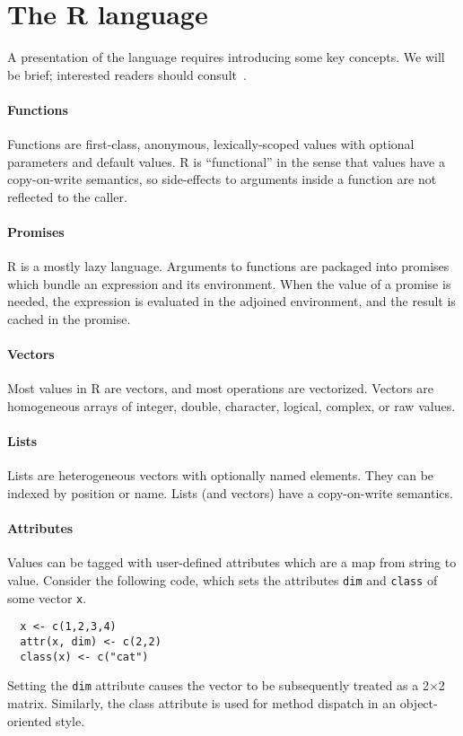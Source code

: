 \documentclass[10pt,sigplan,authorversion=true]{acmart}
\renewcommand{\c}[1]{\lstinline |#1|\xspace}
\begin{document}
\section{The R language}

A presentation of the language requires introducing some key concepts. We will
be brief; interested readers should consult~\cite{AdvancedR}.

\paragraph{Functions} Functions are first-class, anonymous, lexically-scoped values
with optional parameters and default values. R is ``functional'' in the sense
that values have a copy-on-write semantics, so side-effects to arguments inside
a function are not reflected to the caller.

\paragraph{Promises} R is a mostly lazy language. Arguments to functions are
packaged into promises which bundle an expression and its environment. When the
value of a promise is needed, the expression is evaluated in the adjoined
environment, and the result is cached in the promise.

\paragraph{Vectors}  Most values in R are vectors, and most operations are
vectorized. Vectors are homogeneous arrays of integer, double, character,
logical, complex, or raw values.

\paragraph{Lists} Lists are heterogeneous vectors with optionally named elements.
They can be indexed by position or name. Lists (and vectors) have a
copy-on-write semantics.

\paragraph{Attributes}
Values can be tagged with user-defined attributes which are a map from string to
value. Consider the following code, which sets the attributes \c{dim} and
\c{class} of some vector \c{x}.

\begin{lstlisting}
  x <- c(1,2,3,4)
  attr(x, dim) <- c(2,2)
  class(x) <- c("cat")
\end{lstlisting}
\noindent
Setting the \c{dim} attribute causes the vector to be subsequently treated as
a 2$\times$2 matrix. Similarly, the class attribute is used for method dispatch
in an object-oriented style.
\end{document}
